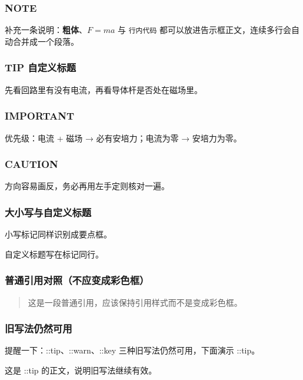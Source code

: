 \documentclass[zihao=-4]{ctexart}
\numberwithin{equation}{section}
\numberwithin{figure}{section}
\numberwithin{table}{section}
\theoremstyle{plain}
\begin{document}
\subsubsection{NOTE}

\begin{notebox}[注意]
补充一条说明：\textbf{粗体}、$F=ma$ 与 \texttt{行内代码} 都可以放进告示框正文，连续多行会自动合并成一个段落。
\end{notebox}

\subsubsection{TIP 自定义标题}

\begin{tipbox}[快速检查]
先看回路里有没有电流，再看导体杆是否处在磁场里。
\end{tipbox}

\subsubsection{IMPORTANT}

\begin{keybox}[重要]
优先级：电流 + 磁场 → 必有安培力；电流为零 → 安培力为零。
\end{keybox}

\subsubsection{CAUTION}

\begin{cautionbox}[小心]
方向容易画反，务必再用左手定则核对一遍。
\end{cautionbox}

\subsubsection{大小写与自定义标题}

\begin{notebox}[注意]
小写标记同样识别成要点框。
\end{notebox}

\begin{warnbox}[自定义警告标题]
自定义标题写在标记同行。
\end{warnbox}

\subsubsection{普通引用对照（不应变成彩色框）}

\begin{quote}
这是一段普通引用，应该保持引用样式而不是变成彩色框。
\end{quote}

\subsubsection{旧写法仍然可用}

提醒一下：::tip、::warn、::key 三种旧写法仍然可用，下面演示 ::tip。

\begin{tipbox}[要点框标题]
这是 ::tip 的正文，说明旧写法继续有效。
\end{tipbox}
\end{document}

